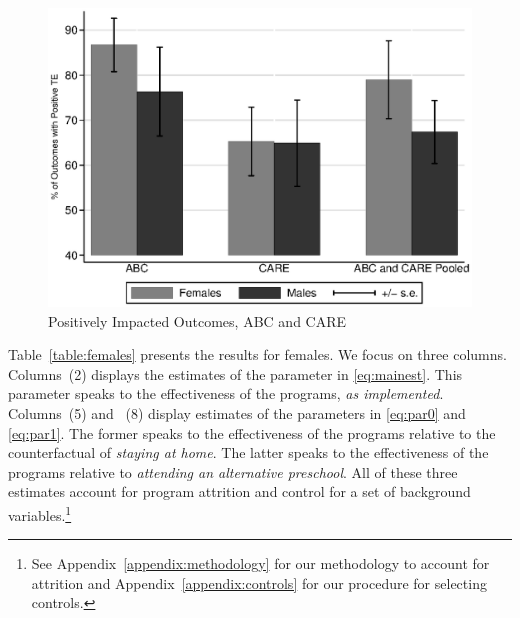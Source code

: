 \begin{figure}[H]
		\caption{Positively Impacted Outcomes, ABC and CARE} \label{fig:ppositive}
		\includegraphics[width=.8\columnwidth]{output/itt_noctrl_all.eps}
\end{figure}

\noindent Table~\ref{table:females} presents the results for females. We focus on three columns. Columns~(2) displays the estimates of the parameter in \eqref{eq:mainest}. This parameter speaks to the effectiveness of the programs, \textit{as implemented}. Columns~(5) and ~(8) display estimates of the parameters in \eqref{eq:par0} and \eqref{eq:par1}. The former speaks to the effectiveness of the programs relative to the counterfactual of \textit{staying at home}. The latter speaks to the effectiveness of the programs relative to \textit{attending an alternative preschool}. All of these three estimates account for program attrition and control for a set of background variables.\footnote{See Appendix~\ref{appendix:methodology} for our methodology to account for attrition and Appendix~\ref{appendix:controls} for our procedure for selecting controls.}\\

